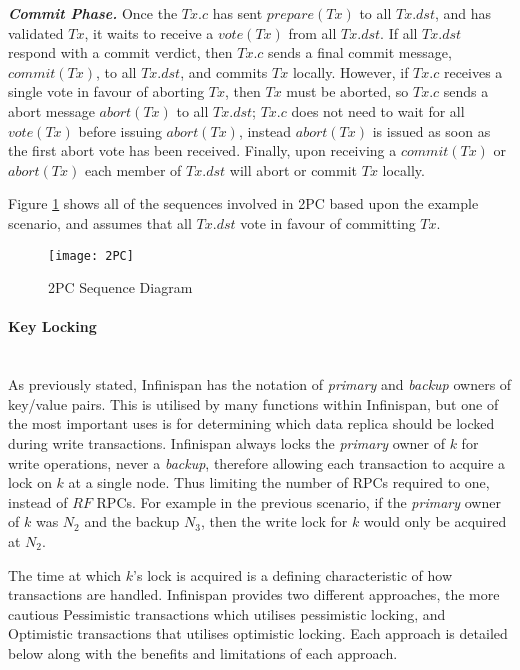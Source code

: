 	       \textbf{\emph{Commit Phase.}}  Once the $Tx.c$ has sent $prepare(Tx)$ to all $Tx.dst$, and has validated $Tx$, it waits to receive a $vote(Tx)$ from all $Tx.dst$.  If all $Tx.dst$ respond with a commit verdict, then $Tx.c$ sends a final commit message, $commit(Tx)$, to all $Tx.dst$, and commits $Tx$ locally.  However, if $Tx.c$ receives a single vote in favour of aborting $Tx$, then $Tx$ must be aborted, so $Tx.c$ sends a abort message $abort(Tx)$ to all $Tx.dst$; $Tx.c$ does not need to wait for all $vote(Tx)$ before issuing $abort(Tx)$, instead $abort(Tx)$ is issued as soon as the first abort vote has been received.  Finally, upon receiving a $commit(Tx)$ or $abort(Tx)$ each member of $Tx.dst$ will abort or commit $Tx$ locally.  
	       
	       Figure \ref{fig:2PC} shows all of the sequences involved in 2PC based upon the example scenario, and assumes that all $Tx.dst$ vote in favour of committing $Tx$.  
	       	       
            \begin{figure}[htbp!] 
                \centering    
                \texttt{[image: 2PC]}
                \caption[Two-phase Commit Protocol]{2PC Sequence Diagram}
                \label{fig:2PC}
            \end{figure}
            
	        \paragraph{Key Locking} \hspace{0pt} \\
	        As previously stated, Infinispan has the notation of \emph{primary} and \emph{backup} owners of key/value pairs.  This is utilised by many functions within Infinispan, but one of the most important uses is for determining which data replica should be locked during write transactions.  Infinispan always locks the \emph{primary} owner of $k$ for write operations, never a \emph{backup}, therefore allowing each transaction to acquire a lock on $k$ at a single node.  Thus limiting the number of RPCs required to one, instead of $RF$ RPCs. For example in the previous scenario, if the \emph{primary} owner of $k$ was $N_2$ and the backup $N_3$, then the write lock for $k$ would only be acquired at $N_2$.  
	        
	        The time at which $k$'s lock is acquired is a defining characteristic of how transactions are handled.  Infinispan provides two different approaches, the more cautious Pessimistic transactions which utilises pessimistic locking, and Optimistic transactions that utilises optimistic locking.  Each approach is detailed below along with the benefits and limitations of each approach.  
	         
